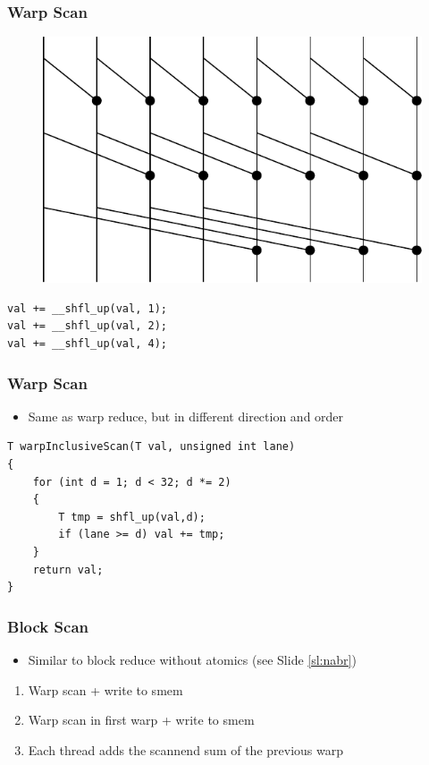 \documentclass[aspectratio=169,handout]{beamer}
\begin{document}
\begin{frame}[fragile]
\frametitle{Warp Scan}
\begin{figure}
	\centering
	\includegraphics[height=0.6\textheight]{warpscan}
\end{figure}
\begin{lstlisting}
val += __shfl_up(val, 1);
val += __shfl_up(val, 2);
val += __shfl_up(val, 4);
\end{lstlisting}
\end{frame}


\begin{frame}[fragile]
\frametitle{Warp Scan}
\begin{itemize}
	\item Same as warp reduce, but in different direction and order
\end{itemize}

\begin{lstlisting}
T warpInclusiveScan(T val, unsigned int lane) 
{
	for (int d = 1; d < 32; d *= 2) 
	{
		T tmp = shfl_up(val,d);
		if (lane >= d) val += tmp;
	}
	return val;
}
\end{lstlisting}

\end{frame}


\begin{frame}[fragile]
\frametitle{Block Scan}
\begin{itemize}
	\item Similar to block reduce without atomics (see Slide \ref{sl:nabr})
\end{itemize}
\begin{enumerate}
	\item Warp scan + write to smem
	\item Warp scan in first warp + write to smem
	\item Each thread adds the scannend sum of the previous warp
\end{enumerate}

\end{frame}
\end{document}
